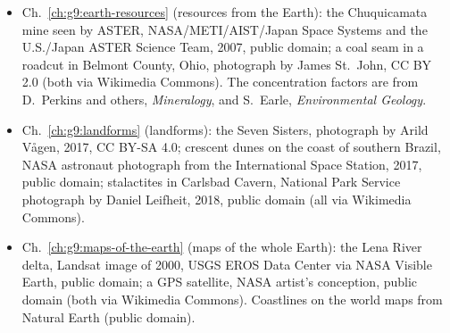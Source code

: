 \begin{itemize}
  \item Ch.~\ref{ch:g9:earth-resources} (resources from the Earth): the Chuquicamata mine seen by ASTER, NASA/METI/AIST/Japan Space Systems and the U.S./Japan ASTER Science Team, 2007, public domain; a coal seam in a roadcut in Belmont County, Ohio, photograph by James St.~John, CC BY 2.0 (both via Wikimedia Commons). The concentration factors are from D.~Perkins and others, \emph{Mineralogy}, and S.~Earle, \emph{Environmental Geology}.
  \item Ch.~\ref{ch:g9:landforms} (landforms): the Seven Sisters, photograph by Arild Vågen, 2017, CC BY-SA 4.0; crescent dunes on the coast of southern Brazil, NASA astronaut photograph from the International Space Station, 2017, public domain; stalactites in Carlsbad Cavern, National Park Service photograph by Daniel Leifheit, 2018, public domain (all via Wikimedia Commons).
  \item Ch.~\ref{ch:g9:maps-of-the-earth} (maps of the whole Earth): the Lena River delta, Landsat image of 2000, USGS EROS Data Center via NASA Visible Earth, public domain; a GPS satellite, NASA artist's conception, public domain (both via Wikimedia Commons). Coastlines on the world maps from Natural Earth (public domain).
\end{itemize}
